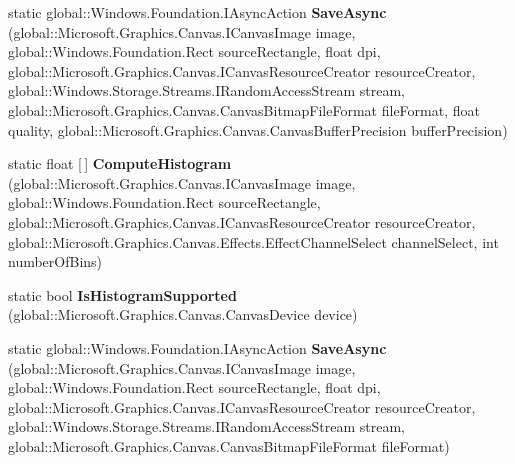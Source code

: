 \begin{DoxyCompactItemize}
static global\+::\+Windows.\+Foundation.\+I\+Async\+Action {\bfseries Save\+Async} (global\+::\+Microsoft.\+Graphics.\+Canvas.\+I\+Canvas\+Image image, global\+::\+Windows.\+Foundation.\+Rect source\+Rectangle, float dpi, global\+::\+Microsoft.\+Graphics.\+Canvas.\+I\+Canvas\+Resource\+Creator resource\+Creator, global\+::\+Windows.\+Storage.\+Streams.\+I\+Random\+Access\+Stream stream, global\+::\+Microsoft.\+Graphics.\+Canvas.\+Canvas\+Bitmap\+File\+Format file\+Format, float quality, global\+::\+Microsoft.\+Graphics.\+Canvas.\+Canvas\+Buffer\+Precision buffer\+Precision)
\item 
\mbox{\label{class_microsoft_1_1_graphics_1_1_canvas_1_1_canvas_image_ac93dfecc525eae062c86e25f3af30682}} 
static float \mbox{[}$\,$\mbox{]} {\bfseries Compute\+Histogram} (global\+::\+Microsoft.\+Graphics.\+Canvas.\+I\+Canvas\+Image image, global\+::\+Windows.\+Foundation.\+Rect source\+Rectangle, global\+::\+Microsoft.\+Graphics.\+Canvas.\+I\+Canvas\+Resource\+Creator resource\+Creator, global\+::\+Microsoft.\+Graphics.\+Canvas.\+Effects.\+Effect\+Channel\+Select channel\+Select, int number\+Of\+Bins)
\item 
\mbox{\label{class_microsoft_1_1_graphics_1_1_canvas_1_1_canvas_image_aff3e5210428f12ae587c08a1c3b26c85}} 
static bool {\bfseries Is\+Histogram\+Supported} (global\+::\+Microsoft.\+Graphics.\+Canvas.\+Canvas\+Device device)
\item 
\mbox{\label{class_microsoft_1_1_graphics_1_1_canvas_1_1_canvas_image_a30ada8b24e212bcbdc24f994e66ad191}} 
static global\+::\+Windows.\+Foundation.\+I\+Async\+Action {\bfseries Save\+Async} (global\+::\+Microsoft.\+Graphics.\+Canvas.\+I\+Canvas\+Image image, global\+::\+Windows.\+Foundation.\+Rect source\+Rectangle, float dpi, global\+::\+Microsoft.\+Graphics.\+Canvas.\+I\+Canvas\+Resource\+Creator resource\+Creator, global\+::\+Windows.\+Storage.\+Streams.\+I\+Random\+Access\+Stream stream, global\+::\+Microsoft.\+Graphics.\+Canvas.\+Canvas\+Bitmap\+File\+Format file\+Format)
\item 
\mbox{\label{class_microsoft_1_1_graphics_1_1_canvas_1_1_canvas_image_a84ddbc832a47bc0660a10d09a095ae1e}} 

\end{DoxyCompactItemize}
